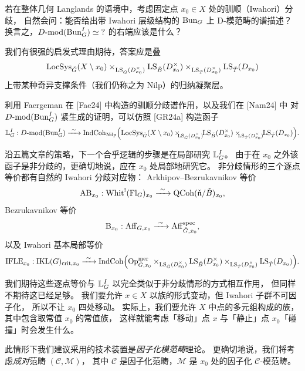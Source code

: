若在整体几何 Langlands 的语境中，考虑固定点 $x_0\in X$ 处的驯顺（Iwahori）分歧，
自然会问：能否给出带 Iwahori 层级结构的 $\mathrm{Bun}_G$ 上 D-模范畴的谱描述？
换言之，$D\text{-}\mathrm{mod}(\mathrm{Bun}^I_G)\simeq{?}$ 的右端应该是什么？

我们有很强的启发式理由期待，答案应是叠
\[
\mathrm{LocSys}_{\check{G}}(X\setminus x_0)
\times_{\mathrm{LS}_{\check{G}}(D^\times_{x_0})}\mathrm{LS}_{\check{B}}(D^\times_{x_0})
\times_{\mathrm{LS}_{\check{T}}(D^\times_{x_0})}\mathrm{LS}_{\check{T}}(D_{x_0})
\]
上带某种奇异支撑条件（我们仍称之为 Nilp）的归纳凝聚层。%

利用 Faergeman 在 [Fae24] 中构造的驯顺分歧谱作用，以及我们在 [Nam24] 中
对 $D\text{-}\mathrm{mod}(\mathrm{Bun}^I_G)$ 紧生成的证明，可以仿照 [GR24a] 构造函子
\[
\mathbb{L}^I_G:D\text{-}\mathrm{mod}(\mathrm{Bun}^I_G)\xrightarrow{\ \sim\ }
\mathrm{IndCoh}_{\mathrm{Nilp}}\Bigl(\mathrm{LocSys}_{\check{G}}(X\setminus x_0)
\times_{\hspace{-0.35em}\mathrm{LS}_{\check{G}}(D^\times_{x_0})}\hspace{-0.35em}\mathrm{LS}_{\check{B}}(D^\times_{x_0})
\times_{\hspace{-0.35em}\mathrm{LS}_{\check{T}}(D^\times_{x_0})}\hspace{-0.35em}\mathrm{LS}_{\check{T}}(D_{x_0})\Bigr).
\]

沿五篇文章的策略，下一个合乎逻辑的步骤是在局部研究 $\mathbb{L}^I_G$。
由于在 $x_0$ 之外该函子是非分歧的，更确切地说，应在 $x_0$ 处局部地研究它。
非分歧情形的三个逐点等价都有自然的 Iwahori 分歧对应物：
Arkhipov–Bezrukavnikov 等价
\[
\AB_{x_0}:\Whit^{!}(\Fl_G)_{x_0}\xrightarrow{\ \sim\ }\QCoh(\nd/\Bd)_{x_0},
\]
Bezrukavnikov 等价
\[
\B_{x_0}:\Aff_{G,x_0}\xrightarrow{\ \sim\ }\Aff^{\spec}_{\Gd,x_0},
\]
以及 Iwahori 基本局部等价
\[
\IFLE_{x_0}:\IKL(G)_{\mathrm{crit},x_0}\xrightarrow{\ \sim\ }
\IndCoh\Bigl(\Op^{\mer}_{\Gd,x_0}
\times_{\LS_{\Gd}(D^\times_{x_0})}\LS_{\Bd}(D^\times_{x_0})
\times_{\LS_{\Td}(D^\times_{x_0})}\LS_{\Td}(D_{x_0})\Bigr).
\]

我们期待这些逐点等价与 $\mathbb{L}^I_G$ 以完全类似于非分歧情形的方式相互作用，
但同样不期待这已经足够。
我们要允许 $x\in X$ 以族的形式变动，但 Iwahori 子群不可因子化，
所以不让 $x_0$ 四处移动。
实际上，我们要允许 $X$ 中点的多元组构成的族，其中包含取常值 $x_0$ 的常值族，
这样就能考虑「移动」点 $x$ 与「静止」点 $x_0$「碰撞」时会发生什么。

此情形下我们建议采用的技术装置是\emph{因子化模范畴}理论。
更确切地说，我们将考虑\emph{成对}范畴 $(\mathcal{C},\mathcal{M})$，
其中 $\mathcal{C}$ 是因子化范畴，$\mathcal{M}$ 是 $x_0$ 处的因子化 $\mathcal{C}$-模范畴。

